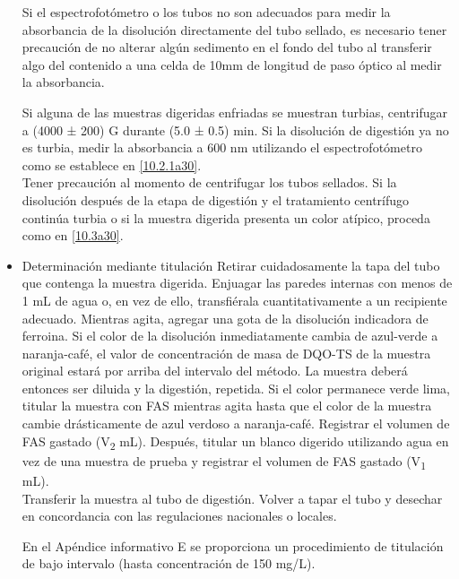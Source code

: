 \begin{itemize}
\begin{teor}
		Si el espectrofotómetro o los tubos no son adecuados para medir la absorbancia de la disolución directamente del tubo sellado, es necesario tener precaución de no alterar algún sedimento en el fondo del tubo al transferir algo del contenido a una celda de 10mm de longitud de paso óptico al medir la absorbancia.
	\end{teor}
	\subitem Si alguna de las muestras digeridas enfriadas se muestran turbias, centrifugar a (4000 ± 200) G durante (5.0 ± 0.5) min. Si la disolución de digestión ya no es turbia, medir la absorbancia a 600 nm utilizando el espectrofotómetro como se establece en \ref{10.2.1a30}.\\Tener precaución al momento de centrifugar los tubos sellados. \label{10.2.2a30}
	\subitem Si la disolución después de la etapa de digestión y el tratamiento centrífugo continúa turbia o si la muestra digerida presenta un color atípico, proceda como en \ref{10.3a30}. \label{10.2.3}
	\item Determinación mediante titulación \label{10.3a30}
	\subitem Retirar cuidadosamente la tapa del tubo que contenga la muestra digerida. Enjuagar las paredes internas con menos de 1 mL de agua o, en vez de ello, transfiérala cuantitativamente a un recipiente adecuado. \label{10.3.1a30}
	\subitem Mientras agita, agregar una gota de la disolución indicadora de ferroina. Si el color de la disolución inmediatamente cambia de azul-verde a naranja-café, el valor de concentración de masa de DQO-TS de la muestra original estará por arriba del intervalo del método. La muestra deberá entonces ser diluida y la digestión, repetida. \label{10.3.2a30}
	\subitem Si el color permanece verde lima, titular la muestra con FAS mientras agita hasta que el color de la muestra cambie drásticamente de azul verdoso a naranja-café. Registrar el volumen de FAS gastado (V\textsubscript{2} mL). Después, titular un blanco digerido utilizando agua en vez de una muestra de prueba y registrar el volumen de FAS gastado (V\textsubscript{1} mL).\\ Transferir la muestra al tubo de digestión. Volver a tapar el tubo y desechar en concordancia con las regulaciones nacionales o locales. \label{10.3.3a30}
	\begin{teor}
		En el Apéndice informativo E se proporciona un procedimiento de titulación de bajo intervalo (hasta concentración de 150 mg/L).
	\end{teor}
\end{itemize}
